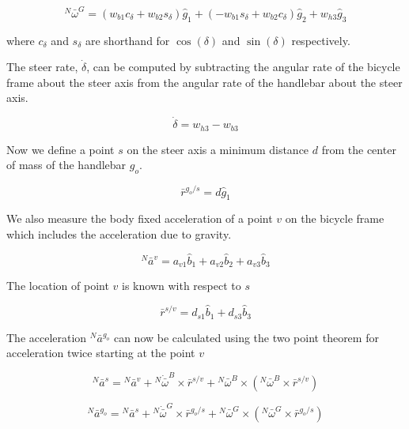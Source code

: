 \documentclass[10pt]{article}
\begin{document}
\begin{equation}
  ^N\bar{\omega}^G = (w_{b1}c_\delta + w_{b2}s_\delta)\hat{g}_1 +
  (-w_{b1}s_\delta + w_{b2}c_\delta)\hat{g}_2 +
  w_{h3}\hat{g}_3
\end{equation}

where $c_\delta$ and $s_\delta$ are shorthand for $\operatorname{cos}(\delta)$
and $\operatorname{sin}(\delta)$ respectively.

The steer rate, $\dot{\delta}$, can be computed by subtracting the angular rate
of the bicycle frame about the steer axis from the angular rate of the
handlebar about the steer axis.

\begin{equation}
  \dot{\delta} = w_{h3} - w_{b3}
\end{equation}

Now we define a point $s$ on the steer axis a minimum distance $d$ from the
center of mass of the handlebar $g_o$.

\begin{equation}
  \bar{r}^{g_o/s} = d\hat{g}_1
\end{equation}

We also measure the body fixed acceleration of a point $v$ on the bicycle frame
which includes the acceleration due to gravity.

\begin{equation}
  ^N\bar{a}^v = a_{v1}\hat{b}_1 + a_{v2}\hat{b}_2 + a_{v3}\hat{b}_3
  \label{eq:acceleration-of-v}
\end{equation}

The location of point $v$ is known with respect to $s$

\begin{equation}
  \bar{r}^{s/v} = d_{s1}\hat{b}_1 + d_{s3}\hat{b}_3
\end{equation}

The acceleration $^N\bar{a}^{g_o}$ can now be calculated using the two point
theorem for acceleration \cite{Kane1985} twice starting at the point $v$

\begin{equation}
  ^N\bar{a}^s = {}^N\bar{a}^v +
    {}^N\dot{\bar{\omega}}^B\times\bar{r}^{s/v} +
    {}^N\bar{\omega}^B\times({}^N\bar{\omega}^B\times\bar{r}^{s/v})
\end{equation}

\begin{equation}
  ^N\bar{a}^{g_o} = {}^N\bar{a}^s +
    {}^N\dot{\bar{\omega}}^G\times\bar{r}^{g_o/s} +
    {}^N\bar{\omega}^G\times({}^N\bar{\omega}^G\times\bar{r}^{g_o/s})
\end{equation}
\end{document}
